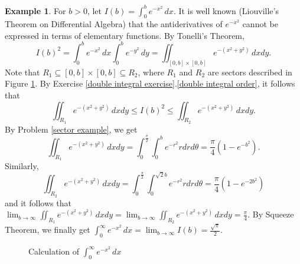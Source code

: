 \documentclass[12pt,letterpaper]{book}
\numberwithin{equation}{section}
\theoremstyle{definition}
\newtheorem{example}[thm]{\textbf{Example}}
\begin{document}
\begin{example}\label{liouville}
For $b>0$, let $\displaystyle{I(b)=\int_0^b e^{-x^2}\,dx}$. It is well known (Liouville's Theorem on Differential Algebra) that the antiderivatives of $e^{-x^2}$ cannot be expressed in terms of elementary functions. By Tonelli's Theorem,
$$I(b)^2=\int_0^b e^{-x^2}\,dx \int_0^b e^{-y^2}\,dy=\iint_{[0,b]\times [0,b]}e^{-(x^2+y^2)}\,dxdy.$$
Note that $R_1\subseteq [0,b]\times [0,b] \subseteq R_2$, where $R_1$ and $R_2$ are sectors described in Figure \ref{sector}. By Exercise \ref{double integral exercise}.\ref{double integral order}, it follows that $$ \iint_{R_1}e^{-(x^2+y^2)}\,dxdy \leq I(b)^2 \leq \iint_{R_2}e^{-(x^2+y^2)}\,dxdy.$$ By Problem \ref{sector example}, we get
$$\iint_{R_1}e^{-(x^2+y^2)}\,dxdy =\int_0^\frac{\pi}{2}\int_0^{b}  e^{-r^2}rdrd\theta=\frac{\pi}{4}\left(1-e^{-b^2}\right).$$
Similarly,
$$\iint_{R_2}e^{-(x^2+y^2)}\,dxdy =\int_0^\frac{\pi}{2}\int_0^{\sqrt{2}b}  e^{-r^2}rdrd\theta=\frac{\pi}{4}\left(1-e^{-2b^2}\right)$$
and it follows that $\displaystyle{\lim_{b\to\infty}\iint_{R_1}e^{-(x^2+y^2)}\,dxdy =\lim_{b\to\infty}\iint_{R_2}e^{-(x^2+y^2)}\,dxdy =\frac{\pi}{4}}$. By Squeeze Theorem, we finally get $\displaystyle{\int_0^\infty e^{-x^2}\,dx=\lim_{b\to\infty}I(b)=\frac{\sqrt{\pi}}{2}}$.

\begin{figure}[h]
\begin{center}
\end{center}
\caption{Calculation of $\displaystyle{\int_0^\infty e^{-x^2}\,dx}$}
\label{sector}
\end{figure}

\end{example}
\end{document}
